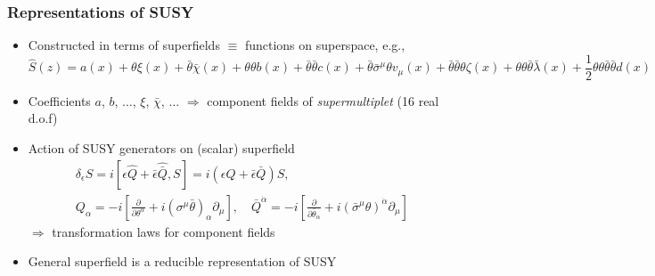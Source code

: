 \documentclass[10pt,aspectratio=169]{beamer}
\begin{document}
\begin{frame}
  \frametitle{Representations of SUSY}
  \begin{itemize}\itemsep1em
  \item Constructed in terms of superfields $\equiv$ functions on superspace,
    e.g.,
    \begin{equation*}
      \hat{S}(z) = a(x) + \theta \xi(x) + \bar{\theta} \bar{\chi}(x) +
      \theta \theta b(x) + \bar{\theta} \bar{\theta} c(x) + \bar{\theta}
      \bar{\sigma}^\mu \theta v_\mu (x)
      + \bar{\theta} \bar{\theta} \theta \zeta(x)
      + \theta \theta \bar{\theta} \bar{\lambda} (x) + \frac{1}{2} \theta
      \theta \bar{\theta} \bar{\theta} d(x)
    \end{equation*}
  \item Coefficients $a$, $b$, $\ldots$, $\xi$, $\bar{\chi}$, $\ldots$
    $\Rightarrow$ component fields of \emph{supermultiplet} (16 real d.o.f)
  \item Action of SUSY generators on (scalar) superfield
    \begin{gather*}
      \delta_\epsilon S = i \left [ \epsilon \hat{Q} + \bar{\epsilon}
        \hat{\bar{Q}}, S \right ]
      = i \left ( \epsilon Q + \bar{\epsilon} \bar{Q} \right ) S ,
      \\
      Q_\alpha = -i \left [ \frac{\partial}{\partial \theta^\alpha}
        + i \left ( \sigma^\mu \bar{\theta} \right )_\alpha
        \partial_\mu \right ] , \quad
      \bar{Q}^{\dot{\alpha}} = -i \left [
        \frac{\partial}{\partial \bar{\theta}_{\dot{\alpha}}} + i \left (
        \bar{\sigma}^\mu \theta \right )^{\dot{\alpha}} \partial_\mu \right ]
    \end{gather*}
    $\Rightarrow$ transformation laws for component fields
  \item General superfield is a \alert{reducible representation of SUSY}
  \end{itemize}
\end{frame}
\end{document}
